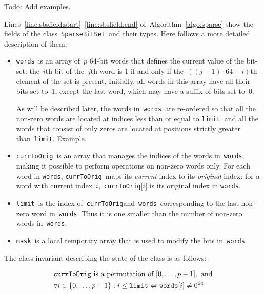 \documentclass[a4paper,11pt]{article}
\newcommand{\Todo}[1]{{\color{blue}#1}}
\newcommand{\Algoref}[1]{Algorithm~\ref{#1}}
\newcommand{\Linesref}[2]{Lines~\ref{#1}--\ref{#2}}
\newcommand{\Words}{\texttt{words}}
\newcommand{\Index}{\texttt{currToOrig}}
\newcommand{\Mask}{\texttt{mask}}
\newcommand{\Limit}{\texttt{limit}}
\newcommand{\SparseBitSet}{\texttt{SparseBitSet}}
\numberwithin{equation}{section}
\begin{document}
\Todo{Todo: Add examples.}

\Linesref{line:sbsfield:start}{line:sbsfield:end} of~\Algoref{algo:sparse} show the fields
of the class~\SparseBitSet~and their types. Here follows a more detailed description of them:

\begin{itemize}
  \item \Words~is an array of~$p$ 64-bit words that defines the current value of the bit-set:
    the~$i$th bit of the~$j$th word is 1 if and only if 
    the~$\left((j-1) \cdot 64 + i\right)$th element of
    the set is present. Initially, all words in this array have all their bits set to~$1$,
    except the last word, which may have a suffix of bits set to~$0$. 

    As will be described later, the words in~\Words~are re-ordered
    so that all the non-zero words are
    located at indices less than or equal to \Limit, and all the words that
    consist of only zeros are located at positions strictly greater than~\Limit.
    \Todo{Example.}

  \item \Index~is an array that manages the indices of the words in~\Words,
    making it possible to perform operations on non-zero words only.
    For each word in \Words, \Index~maps its \emph{current} index to its
    \emph{original} index: for a word with current index~$i$,~\Index[$i$]
    is its original index in \Words.
    
  \item \Limit~is the index of~\Index and~\Words~corresponding
    to the last non-zero word in~\Words.
    Thus it is one smaller than the number of non-zero words in~\Words.

  \item \Mask~is a local temporary array that is used to modify the bits in~\Words.

\end{itemize}

\noindent
The class invariant describing the state of the class is as follows:

\begin{alignat}{1}
  \label{eq:invariant}
  &\Index~\text{is a permutation of~} [0,\dots,p-1],\text{~and} \\
  &\forall i \in \Set{0,\dots,p-1}: i \leq \Limit \Leftrightarrow \Words[i] \neq 0^{64}
\end{alignat}

\end{document}
